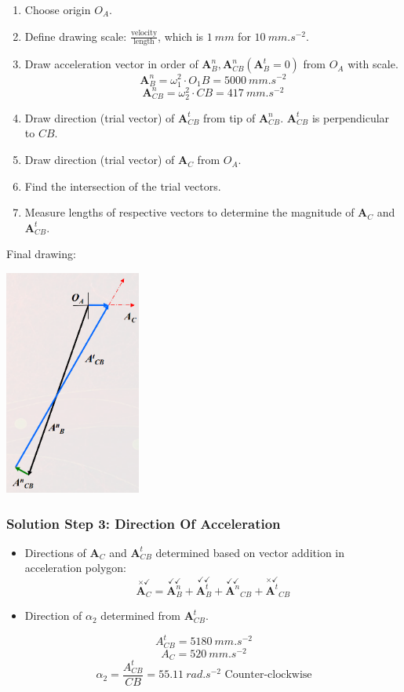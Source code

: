 \documentclass[11pt]{article}
\begin{document}
\begin{enumerate}
\item Choose origin \(O_A\).
\item Define drawing scale: \(\frac{\text{velocity}}{\text{length}}\), which is \(\qty{1}{mm}\) for \(\qty{10}{mm.s^{-2}}\).
\item Draw acceleration vector in order of \(\boldsymbol{A}_B^n, \boldsymbol{A}_{CB}^n (\boldsymbol{A}_B^t = 0)\) from \(O_A\) with scale.
\[\boldsymbol{A}_B^n = \omega_1^2 \cdot O_1 B = \qty{5000}{mm.s^{-2}}\]
\[\boldsymbol{A}_{CB}^n = \omega_2^2 \cdot CB = \qty{417}{mm.s^{-2}}\]
\item Draw direction (trial vector) of \(\boldsymbol{A}_{CB}^t\) from tip of \(\boldsymbol{A}_{CB}^n\). \(\boldsymbol{A}_{CB}^t\) is perpendicular to \(CB\).
\item Draw direction (trial vector) of \(\boldsymbol{A}_C\) from \(O_A\).
\item Find the intersection of the trial vectors.
\item Measure lengths of respective vectors to determine the magnitude of \(\boldsymbol{A}_C\) and \(\boldsymbol{A}_{CB}^t\).
\end{enumerate}

Final drawing:
\begin{center}
\includegraphics[height=20em]{./images/slider-crank-linkage-graphical-analysis-example-acceleration-polygon.png}
\end{center}
\subsubsection{Solution Step 3: Direction Of Acceleration}
\label{sec:orgf87e31d}
\begin{itemize}
\item Directions of \(\boldsymbol{A}_C\) and \(\boldsymbol{A}_{CB}^t\) determined based on vector addition in acceleration polygon:
\[\overset{\times \checkmark}{\boldsymbol{A}_C} = \overset{\checkmark \checkmark}{\boldsymbol{A}_B^n} + \overset{\checkmark \checkmark}{\boldsymbol{A}_B^t} + \overset{\checkmark \checkmark}{\boldsymbol{A}^n}_{CB} + \overset{\times \checkmark}{\boldsymbol{A}^t}_{CB}\]
\item Direction of \(\alpha_2\) determined from \(\boldsymbol{A}_{CB}^t\).
\end{itemize}
\[A_{CB}^t = \qty{5180}{mm.s^{-2}}\]
\[A_C = \qty{520}{mm.s^{-2}}\]
\[\alpha_2 = \frac{A_{CB}^t}{CB} = \qty{55.11}{rad.s^{-2}} \text{ Counter-clockwise}\]
\end{document}
